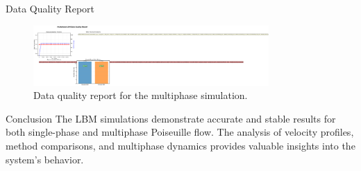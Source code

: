 \documentclass{beamer}
\begin{document}
\begin{frame}{Data Quality Report}
  \begin{figure}
    \includegraphics[width=0.8\textwidth]{plots/multiphase/data_quality_report.png}
    \caption{Data quality report for the multiphase simulation.}
  \end{figure}
\end{frame}

\begin{frame}{Conclusion}
  The LBM simulations demonstrate accurate and stable results for both single-phase and multiphase Poiseuille flow. The analysis of velocity profiles, method comparisons, and multiphase dynamics provides valuable insights into the system's behavior.
\end{frame}
\end{document}
